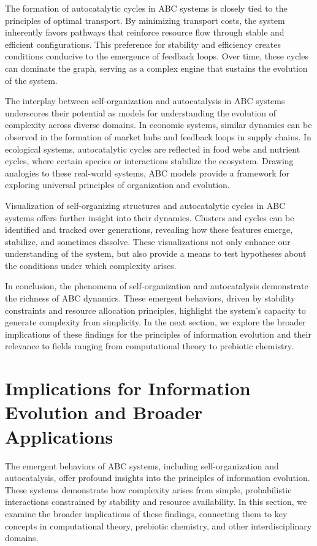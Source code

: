 \documentclass[%
 preprint, linenumbers,
 amsmath,amssymb,
 aps, physrev,
]{revtex4-2}
\begin{document}
The formation of autocatalytic cycles in ABC systems is closely tied to the principles of optimal transport. By minimizing transport costs, the system inherently favors pathways that reinforce resource flow through stable and efficient configurations. This preference for stability and efficiency creates conditions conducive to the emergence of feedback loops. Over time, these cycles can dominate the graph, serving as a complex engine that sustains the evolution of the system.

The interplay between self-organization and autocatalysis in ABC systems underscores their potential as models for understanding the evolution of complexity across diverse domains. In economic systems, similar dynamics can be observed in the formation of market hubs and feedback loops in supply chains. In ecological systems, autocatalytic cycles are reflected in food webs and nutrient cycles, where certain species or interactions stabilize the ecosystem. Drawing analogies to these real-world systems, ABC models provide a framework for exploring universal principles of organization and evolution.

Visualization of self-organizing structures and autocatalytic cycles in ABC systems offers further insight into their dynamics. Clusters and cycles can be identified and tracked over generations, revealing how these features emerge, stabilize, and sometimes dissolve. These visualizations not only enhance our understanding of the system, but also provide a means to test hypotheses about the conditions under which complexity arises.

In conclusion, the phenomena of self-organization and autocatalysis demonstrate the richness of ABC dynamics. These emergent behaviors, driven by stability constraints and resource allocation principles, highlight the system’s capacity to generate complexity from simplicity. In the next section, we explore the broader implications of these findings for the principles of information evolution and their relevance to fields ranging from computational theory to prebiotic chemistry.

\section{Implications for Information Evolution and Broader Applications}

The emergent behaviors of ABC systems, including self-organization and autocatalysis, offer profound insights into the principles of information evolution. These systems demonstrate how complexity arises from simple, probabilistic interactions constrained by stability and resource availability. In this section, we examine the broader implications of these findings, connecting them to key concepts in computational theory, prebiotic chemistry, and other interdisciplinary domains.
\end{document}
